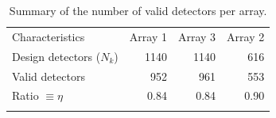 
\begin{table}[!htbp]
  \begin{center}
    \caption[Number of detectors]{Summary of the number of valid detectors per array.}
    \label{tab:number_of_kids}  
    \begin{tabular}{lrrr}
      \hline
      \hline
      \noalign{\smallskip}
      Characteristics & Array 1 & Array 3  & Array 2  \\
      \noalign{\smallskip}
      \hline
      \noalign{\smallskip}
      Design detectors ($N_k$)  & 1140  & 1140   & 616  \\
      Valid detectors           & 952   & 961    & 553  \\ 
      Ratio $\equiv \eta$       & 0.84  & 0.84   & 0.90   \\
      \noalign{\smallskip}
      \hline
    \end{tabular}
  \end{center}    
\end{table}



